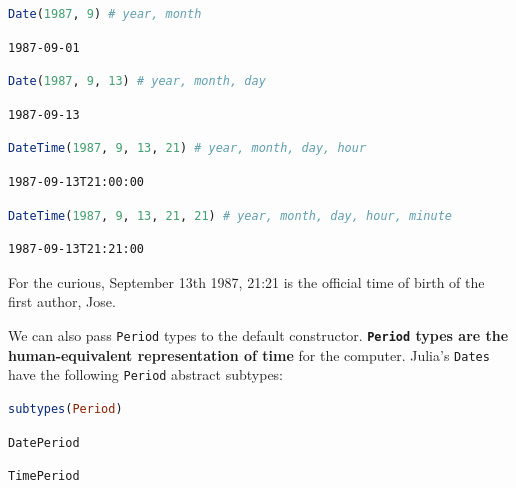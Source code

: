 \documentclass[
  notoc %
]{tufte-book}
\newcommand{\passthrough}[1]{#1}
\begin{document}
\begin{lstlisting}[language=Julia]
Date(1987, 9) # year, month
\end{lstlisting}

\begin{lstlisting}[language=Output]
1987-09-01
\end{lstlisting}

\begin{lstlisting}[language=Julia]
Date(1987, 9, 13) # year, month, day
\end{lstlisting}

\begin{lstlisting}[language=Output]
1987-09-13
\end{lstlisting}

\begin{lstlisting}[language=Julia]
DateTime(1987, 9, 13, 21) # year, month, day, hour
\end{lstlisting}

\begin{lstlisting}[language=Output]
1987-09-13T21:00:00
\end{lstlisting}

\begin{lstlisting}[language=Julia]
DateTime(1987, 9, 13, 21, 21) # year, month, day, hour, minute
\end{lstlisting}

\begin{lstlisting}[language=Output]
1987-09-13T21:21:00
\end{lstlisting}

For the curious, September 13th 1987, 21:21 is the official time of
birth of the first author, Jose.

We can also pass \passthrough{\lstinline!Period!} types to the default
constructor. \textbf{\passthrough{\lstinline!Period!} types are the
human-equivalent representation of time} for the computer. Julia's
\passthrough{\lstinline!Dates!} have the following
\passthrough{\lstinline!Period!} abstract subtypes:

\begin{lstlisting}[language=Julia]
subtypes(Period)
\end{lstlisting}

\begin{lstlisting}[language=Output]
DatePeriod
\end{lstlisting}

\begin{lstlisting}[language=Output]
TimePeriod
\end{lstlisting}
\end{document}
